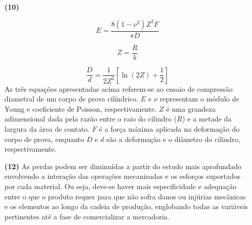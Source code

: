 \documentclass[a4paper, 12pt, brazilian]{article}
\begin{document}
\begin{itemize}
		\item[\textbf{(10)}]
		
		\begin{equation}
			E=\dfrac{8(1-\nu^{2})Z^{2}F}{\pi D}
		\end{equation}
		
		\begin{equation}
			Z=\dfrac{R}{b}
		\end{equation}
		
		\begin{equation}
			\dfrac{D}{d}=\dfrac{1}{2Z^{2}}\left[\ln (2Z)+\dfrac{1}{2}\right]
		\end{equation}
		As três equações apresentadas acima referem-se ao ensaio de compressão diametral de um corpo de prova cilíndrico. $E$ e $\nu$ representam o módulo de Young e coeficiente de Poisson, respectivamente. $Z$ é uma grandeza adimensional dada pela razão entre o raio do cilindro ($R$) e a metade da largura da área de contato. $F$ é a força máxima aplicada na deformação do corpo de prova, enquanto $D$ e $d$ são a deformação e o diâmetro do cilindro, respectivamente.
		
		\item[\textbf{(12)}] As perdas podem ser diminuídas a partir do estudo mais aprofundado envolvendo a interação das operações mecanizadas e os esforços suportados por cada material. Ou seja, deve-se haver mais especificidade e adequação entre o que o produto requer para que não sofra danos ou injúrias mecânicas e os elementos ao longo da cadeia de produção, englobando todas as variáveis pertinentes até a fase de comercializar a mercadoria.
	\end{itemize} 
\end{document}
